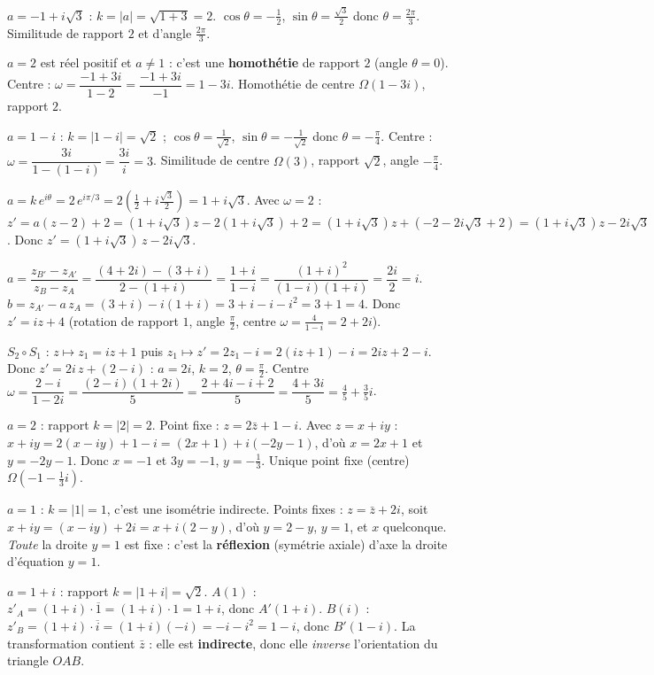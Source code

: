 $a=-1+i\sqrt3$ : $k=|a|=\sqrt{1+3}=2$. $\cos\theta=-\frac12$, $\sin\theta=\frac{\sqrt3}2$ donc $\theta=\frac{2\pi}{3}$.
Similitude de rapport $2$ et d'angle $\frac{2\pi}{3}$.

$a=2$ est réel positif et $a\neq1$ : c'est une \textbf{homothétie} de rapport $2$ (angle $\theta=0$).
Centre : $\omega=\dfrac{-1+3i}{1-2}=\dfrac{-1+3i}{-1}=1-3i$. Homothétie de centre $\Omega(1-3i)$, rapport $2$.

$a=1-i$ : $k=|1-i|=\sqrt2$ ; $\cos\theta=\frac1{\sqrt2}$, $\sin\theta=-\frac1{\sqrt2}$ donc $\theta=-\frac\pi4$.
Centre : $\omega=\dfrac{3i}{1-(1-i)}=\dfrac{3i}{i}=3$. Similitude de centre $\Omega(3)$, rapport $\sqrt2$, angle $-\frac\pi4$.

$a=k\,e^{i\theta}=2\,e^{i\pi/3}=2\left(\frac12+i\frac{\sqrt3}2\right)=1+i\sqrt3$. Avec $\omega=2$ :
$z'=a(z-2)+2=(1+i\sqrt3)z-2(1+i\sqrt3)+2=(1+i\sqrt3)z+(-2-2i\sqrt3+2)=(1+i\sqrt3)z-2i\sqrt3$.
Donc $z'=(1+i\sqrt3)\,z-2i\sqrt3$.

$a=\dfrac{z_{B'}-z_{A'}}{z_B-z_A}=\dfrac{(4+2i)-(3+i)}{2-(1+i)}=\dfrac{1+i}{1-i}=\dfrac{(1+i)^2}{(1-i)(1+i)}=\dfrac{2i}{2}=i$.
$b=z_{A'}-a\,z_A=(3+i)-i(1+i)=3+i-i-i^2=3+1=4$. Donc $z'=iz+4$ (rotation de rapport $1$, angle $\frac\pi2$, centre
$\omega=\frac{4}{1-i}=2+2i$).

$S_2\circ S_1$ : $z\mapsto z_1=iz+1$ puis $z_1\mapsto z'=2z_1-i=2(iz+1)-i=2iz+2-i$.
Donc $z'=2i\,z+(2-i)$ : $a=2i$, $k=2$, $\theta=\frac\pi2$. Centre $\omega=\dfrac{2-i}{1-2i}=\dfrac{(2-i)(1+2i)}{5}
=\dfrac{2+4i-i+2}{5}=\dfrac{4+3i}{5}=\frac45+\frac35 i$.

$a=2$ : rapport $k=|2|=2$. Point fixe : $z=2\bar z+1-i$. Avec $z=x+iy$ :
$x+iy=2(x-iy)+1-i=(2x+1)+i(-2y-1)$, d'où $x=2x+1$ et $y=-2y-1$. Donc $x=-1$ et $3y=-1$, $y=-\frac13$.
Unique point fixe (centre) $\Omega\!\left(-1-\frac13 i\right)$.

$a=1$ : $k=|1|=1$, c'est une isométrie indirecte. Points fixes : $z=\bar z+2i$, soit
$x+iy=(x-iy)+2i=x+i(2-y)$, d'où $y=2-y$, $y=1$, et $x$ quelconque. \emph{Toute} la droite $y=1$ est fixe :
c'est la \textbf{réflexion} (symétrie axiale) d'axe la droite d'équation $y=1$.

$a=1+i$ : rapport $k=|1+i|=\sqrt2$. $A(1)$ : $z'_A=(1+i)\cdot\overline{1}=(1+i)\cdot1=1+i$, donc $A'(1+i)$.
$B(i)$ : $z'_B=(1+i)\cdot\overline{i}=(1+i)(-i)=-i-i^2=1-i$, donc $B'(1-i)$. La transformation contient $\bar z$ :
elle est \textbf{indirecte}, donc elle \emph{inverse} l'orientation du triangle $OAB$.

